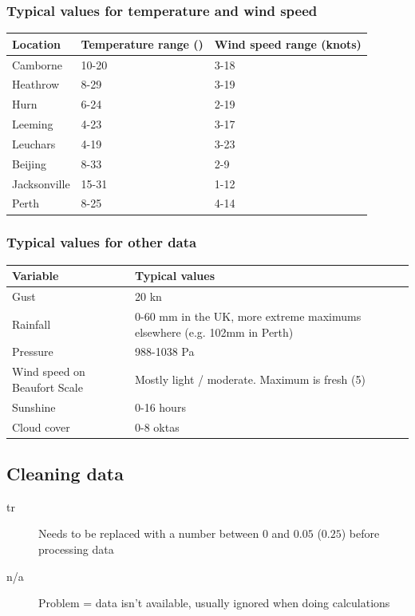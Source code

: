 \documentclass[A4paper, 11pt]{article}
\begin{document}
	\subsubsection{Typical values for temperature and wind speed}
	\begin{tabular}{|l|l|l|}
		\hline
		\textbf{Location} & \textbf{Temperature range (\textcelsius)}& \textbf{Wind speed range (knots)} \\
		\hline
		Camborne & 10-20 & 3-18 \\
		\hline
		Heathrow & 8-29 & 3-19 \\
		\hline
		Hurn & 6-24 & 2-19 \\
		\hline
		Leeming & 4-23 & 3-17 \\
		\hline
		Leuchars & 4-19 & 3-23 \\
		\hline
		Beijing & 8-33 & 2-9 \\
		\hline
		Jacksonville & 15-31 & 1-12 \\
		\hline
		Perth & 8-25 & 4-14 \\
		\hline
	\end{tabular}
	
	\subsubsection{Typical values for other data}
	\begin{tabular}{|p{4.8cm} | p{12.2cm}|}
		\hline
		\textbf{Variable} & \textbf{Typical values} \\
		\hline
		Gust & 20 kn \\
		\hline
		Rainfall & 0-60 mm in the UK, more extreme maximums elsewhere (e.g. 102mm in Perth) \\
		\hline
		Pressure & 988-1038 Pa \\
		\hline
		Wind speed on Beaufort Scale & Mostly light / moderate. Maximum is fresh (5) \\
		\hline
		Sunshine & 0-16 hours \\
		\hline
		Cloud cover & 0-8 oktas \\
		\hline
	\end{tabular}
	
	\subsection{Cleaning data}
	\begin{description}
		\item[tr] Needs to be replaced with a number between $0$ and $0.05$ ($0.25$) before processing data
		\item[n/a] Problem = data isn't available, usually ignored when doing calculations
	\end{description}
	
\end{document}
